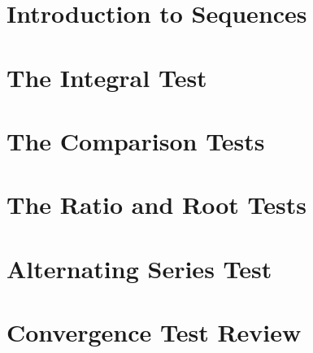 \documentclass[twoside, addpoints, 12pt, letterpage]{exam}
\begin{document}
\section{Introduction to Sequences}
\cleardoublepage

\section{The Integral Test}
\cleardoublepage

\section{The Comparison Tests}
\cleardoublepage

\section{The Ratio and Root Tests}
\cleardoublepage

\section{Alternating Series Test}
\cleardoublepage

\section{Convergence Test Review}
\cleardoublepage
\end{document}

